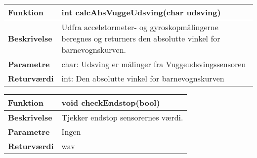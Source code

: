 \begin{center}
    \begin{tabular}{ | l | p{10cm} |}
    \hline
    \textbf{Funktion}	 	& int calcAbsVuggeUdsving(char udsving)										\\ \hline
    \textbf{Beskrivelse} 	& Udfra acceletormeter- og gyroskopmålingerne beregnes og returners den absolutte vinkel for barnevognskurven. 		\\ \hline
    \textbf{Parametre}		& char: Udsving er målinger fra Vuggeudsvingssensoren 		\\ \hline
    \textbf{Returværdi} 	& int: Den absolutte vinkel for barnevognskurven			\\ \hline
    \end{tabular}
\end{center}



\begin{center}
    \begin{tabular}{ | l | p{10cm} |}
    \hline
    \textbf{Funktion}	 	& void checkEndstop(bool)										\\ \hline
    \textbf{Beskrivelse} 	& Tjekker endstop sensorernes værdi.		\\ \hline
    \textbf{Parametre}		& Ingen			 										\\ \hline
    \textbf{Returværdi} 	& wav		 											\\ \hline
    \end{tabular}
\end{center}
